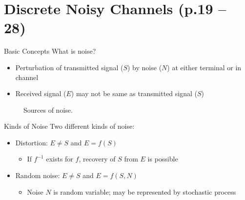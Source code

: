 \documentclass{beamer}
\begin{document}
  \section{Discrete Noisy Channels \small (p.19 -- 28)}

  \begin{frame}{Basic Concepts}
    What is noise?
    \begin{itemize}
      \item Perturbation of transmitted signal ($S$) by noise ($N$) at either terminal or in channel
      \item Received signal ($E$) may not be same as transmitted signal ($S$)
    \end{itemize}

    \begin{figure}
      \footnotesize
      \caption{Sources of noise.}
    \end{figure}
  \end{frame}

  \begin{frame}{Kinds of Noise}
    Two different kinds of noise:
    \begin{itemize}
      \item Distortion: $E \neq S$ and $E = f(S)$
      \begin{itemize}
        \item If $f^{-1}$ exists for $f$, recovery of $S$ from $E$ is possible
      \end{itemize}
      \item Random noise: $E \neq S$ and $E = f(S, N)$
      \begin{itemize}
        \item Noise $N$ is random variable; may be represented by stochastic
        process
      \end{itemize}
    \end{itemize}
  \end{frame}
\end{document}
